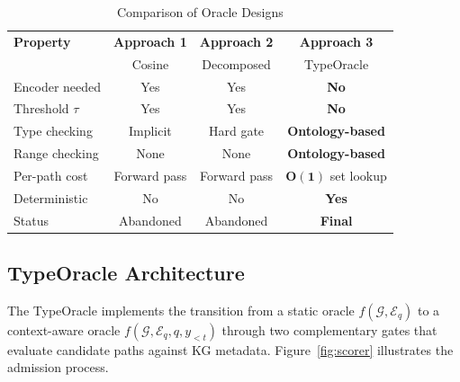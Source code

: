 \begin{table}[H]
  \centering
  \caption[\normalfont Comparison of Oracle Designs]{Comparison of Oracle Designs}
  \label{tab:approach_comparison}
  \begin{tabularx}{\textwidth}{|X|c|c|c|}
    \hline
    \textbf{Property} & \textbf{Approach 1} & \textbf{Approach 2} & \textbf{Approach 3}        \\
                      & Cosine              & Decomposed          & TypeOracle                 \\
    \hline
    Encoder needed    & Yes                 & Yes                 & \textbf{No}                \\
    \hline
    Threshold $\tau$  & Yes                 & Yes                 & \textbf{No}                \\
    \hline
    Type checking     & Implicit            & Hard gate           & \textbf{Ontology-based}    \\
    \hline
    Range checking    & None                & None                & \textbf{Ontology-based}    \\
    \hline
    Per-path cost     & Forward pass        & Forward pass        & $\mathbf{O(1)}$ set lookup \\
    \hline
    Deterministic     & No                  & No                  & \textbf{Yes}               \\
    \hline
    Status            & Abandoned           & Abandoned           & \textbf{Final}             \\
    \hline
  \end{tabularx}
\end{table}

\subsection{TypeOracle Architecture}
\label{sec:ch3oracle}

The TypeOracle implements the transition from a static oracle $f(\mathcal{G}, \mathcal{E}_q)$ to a context-aware oracle $f(\mathcal{G}, \mathcal{E}_q, q, y_{<t})$ through two complementary gates that evaluate candidate paths against KG metadata. Figure~\ref{fig:scorer} illustrates the admission process.

